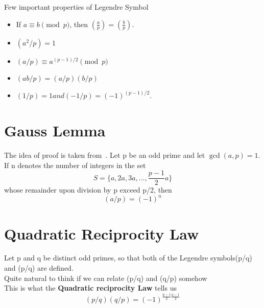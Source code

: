 \documentclass[20pt,a4paper]{article}
\begin{document}
Few important properties of Legendre Symbol

\begin{itemize}
\item If $a \equiv b \pmod{p}$, then $\left(\frac{a}{p}\right) = \left(\frac{b}{p}\right)$.
\item $(a^2/p)=1$
\item $(a/p) \equiv a^{(p-1)/2} \pmod{p}$
\item $(ab/p) = (a/p)(b/p)$
\item $(1/p)=1 and (-1/p) = (-1)^{(p-1)/2}.$
\end{itemize}
\section{Gauss Lemma}
The idea of proof is taken from~\cite{enwiki:1152801587}.
Let p be an odd prime and let $\gcd(a,p) =1$. If n denotes the number of integers in the set
\[
S = \{a, 2a, 3a, \dots, \frac{p-1}{2}a\}
\]
whose remainder upon division by p exceed p/2, then
\begin{equation}
   (a/p)=(-1)^{n} \label{eqn:gauss}
\end{equation}
\section{Quadratic Reciprocity Law}
Let p and q be distinct odd primes, so that both of the Legendre symbols(p/q) and (p/q) are defined.\\
Quite natural to think if we can relate (p/q) and (q/p) somehow\\
This is what the \textbf{Quadratic reciprocity Law} tells us
\begin{equation}
    (p/q)(q/p)=(-1)^{\frac{p-1}{2}\frac{q-1}{2}}
\end{equation}
\end{document}
